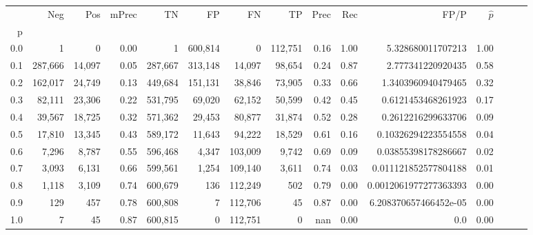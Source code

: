 \begin{tabular}{rrrrrrrrrrrrrrr}
\toprule
{} &      Neg &     Pos & mPrec &       TN &       FP &       FN &       TP &  Prec &   Rec &                   FP/P & $\hat{p}$ \\
p   &          &         &       &          &          &          &          &       &       &                        &           \\
\midrule
0.0 &        1 &       0 &  0.00 &        1 &  600,814 &        0 &  112,751 &  0.16 &  1.00 &      5.328680011707213 &      1.00 \\
0.1 &  287,666 &  14,097 &  0.05 &  287,667 &  313,148 &   14,097 &   98,654 &  0.24 &  0.87 &      2.777341220920435 &      0.58 \\
0.2 &  162,017 &  24,749 &  0.13 &  449,684 &  151,131 &   38,846 &   73,905 &  0.33 &  0.66 &     1.3403960940479465 &      0.32 \\
0.3 &   82,111 &  23,306 &  0.22 &  531,795 &   69,020 &   62,152 &   50,599 &  0.42 &  0.45 &     0.6121453468261923 &      0.17 \\
0.4 &   39,567 &  18,725 &  0.32 &  571,362 &   29,453 &   80,877 &   31,874 &  0.52 &  0.28 &     0.2612216299633706 &      0.09 \\
0.5 &   17,810 &  13,345 &  0.43 &  589,172 &   11,643 &   94,222 &   18,529 &  0.61 &  0.16 &    0.10326294223554558 &      0.04 \\
0.6 &    7,296 &   8,787 &  0.55 &  596,468 &    4,347 &  103,009 &    9,742 &  0.69 &  0.09 &    0.03855398178286667 &      0.02 \\
0.7 &    3,093 &   6,131 &  0.66 &  599,561 &    1,254 &  109,140 &    3,611 &  0.74 &  0.03 &   0.011121852577804188 &      0.01 \\
0.8 &    1,118 &   3,109 &  0.74 &  600,679 &      136 &  112,249 &      502 &  0.79 &  0.00 &  0.0012061977277363393 &      0.00 \\
0.9 &      129 &     457 &  0.78 &  600,808 &        7 &  112,706 &       45 &  0.87 &  0.00 &  6.208370657466452e-05 &      0.00 \\
1.0 &        7 &      45 &  0.87 &  600,815 &        0 &  112,751 &        0 &   nan &  0.00 &                    0.0 &      0.00 \\
\bottomrule
\end{tabular}
